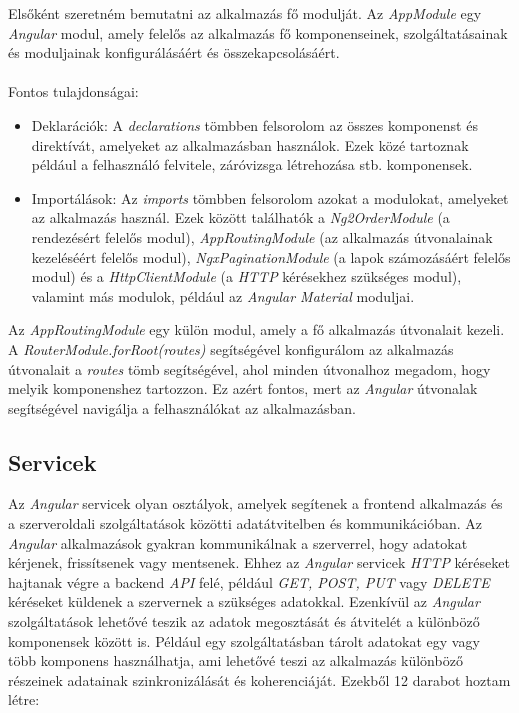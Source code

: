 Elsőként szeretném bemutatni az alkalmazás fő modulját. Az \textit{AppModule} egy \textit{Angular} modul, amely felelős az alkalmazás fő komponenseinek, szolgáltatásainak és moduljainak konfigurálásáért és összekapcsolásáért. \\
\\Fontos tulajdonságai:

\begin{itemize}

\item{Deklarációk:} A \textit{declarations} tömbben felsorolom az összes komponenst és direktívát, amelyeket az alkalmazásban használok. Ezek közé tartoznak például a felhasználó felvitele, záróvizsga létrehozása stb. komponensek. 

\item{Importálások:} Az \textit{imports} tömbben felsorolom azokat a modulokat, amelyeket az alkalmazás használ. Ezek között találhatók a \textit{Ng2OrderModule} (a rendezésért felelős modul), \textit{AppRoutingModule} (az alkalmazás útvonalainak kezeléséért felelős modul), \textit{NgxPaginationModule} (a lapok számozásáért felelős modul) és a \textit{HttpClientModule} (a \textit{HTTP} kérésekhez szükséges modul), valamint más modulok, például az \textit{Angular Material} moduljai.

\end{itemize}

Az \textit{AppRoutingModule} egy külön modul, amely a fő alkalmazás útvonalait kezeli. A \textit{RouterModule.forRoot(routes)} segítségével konfigurálom az alkalmazás útvonalait a \textit{routes} tömb segítségével, ahol minden útvonalhoz megadom, hogy melyik komponenshez tartozzon. Ez azért fontos, mert az \textit{Angular} útvonalak segítségével navigálja a felhasználókat az alkalmazásban.

\subsection{Servicek}

Az \textit{Angular} servicek olyan osztályok, amelyek segítenek a frontend alkalmazás és a szerveroldali  szolgáltatások közötti adatátvitelben és kommunikációban. Az \textit{Angular} alkalmazások gyakran kommunikálnak a szerverrel, hogy adatokat kérjenek, frissítsenek vagy mentsenek. Ehhez az \textit{Angular} servicek \textit{HTTP} kéréseket hajtanak végre a backend \textit{API} felé, például \textit{GET, POST, PUT} vagy \textit{DELETE} kéréseket küldenek a szervernek a szükséges adatokkal. Ezenkívül az \textit{Angular} szolgáltatások lehetővé teszik az adatok megosztását és átvitelét a különböző komponensek között is. Például egy szolgáltatásban tárolt adatokat egy vagy több komponens használhatja, ami lehetővé teszi az alkalmazás különböző részeinek adatainak szinkronizálását és koherenciáját. Ezekből 12 darabot hoztam létre:

